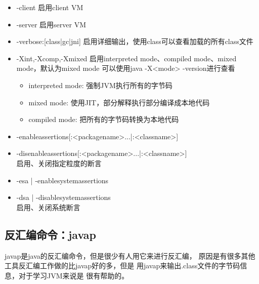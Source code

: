 \begin{itemize}
  \item -client 启用client VM
  \item -server 启用server VM
  \item -verbose:[class|gc|jni] 启用详细输出，使用class可以查看加载的所有class文件
  \item -Xint,-Xcomp,-Xmixed 启用interpreted mode、compiled mode、mixed mode，默认为mixed mode
  可以使用java -X<mode> -version进行查看
    \begin{itemize}
      \item interpreted mode: 强制JVM执行所有的字节码
      \item mixed mode: 使用JIT，部分解释执行部分编译成本地代码
      \item compiled mode: 把所有的字节码转换为本地代码
    \end{itemize}
  \item -enableassertions[:<packagename>...|:<classname>]
  \item -disenableassertions[:<packagename>...|:<classname>]\\
  启用、关闭指定粒度的断言
  \item  -esa | -enablesystemassertions
  \item -dsa | -disablesystemassertions\\
  启用、关闭系统断言
\end{itemize}

\subsection[反汇编命令：javap]{反汇编命令：javap}
javap是java的反汇编命令，但是很少有人用它来进行反汇编，
原因是有很多其他工具反汇编工作做的比javap好的多，但是
用javap来输出.class文件的字节码信息，对于学习JVM来说是
很有帮助的。
